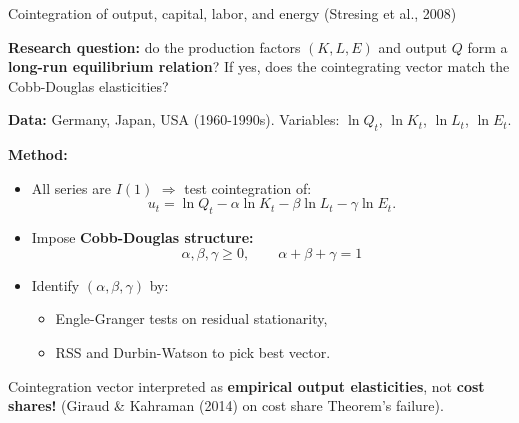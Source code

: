 \documentclass{beamer}
\begin{document}
\begin{frame}{Cointegration of output, capital, labor, and energy (Stresing et al., 2008)}
\small

\textbf{Research question:} do the production factors $(K,L,E)$ and output $Q$ form a \textbf{long-run equilibrium relation}?  If yes, does the cointegrating vector match the Cobb-Douglas elasticities?

\medskip

\textbf{Data:} Germany, Japan, USA (1960-1990s).  
Variables: $\ln Q_t$, $\ln K_t$, $\ln L_t$, $\ln E_t$.

\medskip

\textbf{Method:}
\begin{itemize}
  \item All series are $I(1)$ $\Rightarrow$ test cointegration of:
  \[
    u_t = \ln Q_t - \alpha\ln K_t - \beta\ln L_t - \gamma\ln E_t.
  \]
  \item Impose \textbf{Cobb-Douglas structure:}  
  \[
    \alpha,\beta,\gamma\ge 0,\qquad \alpha+\beta+\gamma=1
  \]
  \item Identify $(\alpha,\beta,\gamma)$ by:
  \begin{itemize}
      \item Engle-Granger tests on residual stationarity,  
      \item RSS and Durbin-Watson to pick best vector.
  \end{itemize}
\end{itemize}

Cointegration vector interpreted as \textbf{empirical output elasticities}, not \textbf{cost shares!} (Giraud \& Kahraman (2014) on cost share Theorem's failure).
\end{frame}
\end{document}

